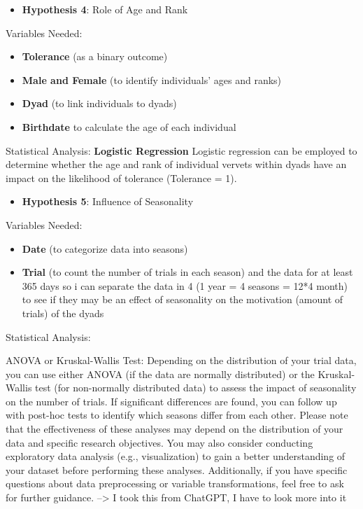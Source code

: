\documentclass[
]{article}
\providecommand{\tightlist}{%
  \setlength{\itemsep}{0pt}\setlength{\parskip}{0pt}}
\begin{document}
\begin{itemize}
\tightlist
\item
  \textbf{Hypothesis 4}: Role of Age and Rank
\end{itemize}

Variables Needed:

\begin{itemize}
\tightlist
\item
  \textbf{Tolerance} (as a binary outcome)
\item
  \textbf{Male and Female} (to identify individuals' ages and ranks)
\item
  \textbf{Dyad} (to link individuals to dyads)
\item
  \textbf{Birthdate} to calculate the age of each individual
\end{itemize}

Statistical Analysis: \textbf{Logistic Regression} Logistic regression
can be employed to determine whether the age and rank of individual
vervets within dyads have an impact on the likelihood of tolerance
(Tolerance = 1).

\begin{itemize}
\tightlist
\item
  \textbf{Hypothesis 5}: Influence of Seasonality
\end{itemize}

Variables Needed:

\begin{itemize}
\tightlist
\item
  \textbf{Date} (to categorize data into seasons)
\item
  \textbf{Trial} (to count the number of trials in each season) and the
  data for at least 365 days so i can separate the data in 4 (1 year = 4
  seasons = 12*4 month) to see if they may be an effect of seasonality
  on the motivation (amount of trials) of the dyads
\end{itemize}

Statistical Analysis:

ANOVA or Kruskal-Wallis Test: Depending on the distribution of your
trial data, you can use either ANOVA (if the data are normally
distributed) or the Kruskal-Wallis test (for non-normally distributed
data) to assess the impact of seasonality on the number of trials. If
significant differences are found, you can follow up with post-hoc tests
to identify which seasons differ from each other. Please note that the
effectiveness of these analyses may depend on the distribution of your
data and specific research objectives. You may also consider conducting
exploratory data analysis (e.g., visualization) to gain a better
understanding of your dataset before performing these analyses.
Additionally, if you have specific questions about data preprocessing or
variable transformations, feel free to ask for further guidance.
--\textgreater{} I took this from ChatGPT, I have to look more into it
\end{document}
